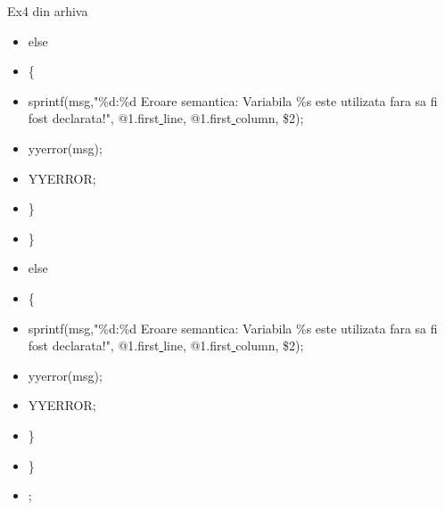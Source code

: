 \documentclass[pdf]{beamer}
\begin{document}
\begin{frame}[shrink=10]{Ex4 din arhiva}
\begin{itemize}
\item 
 else
 \item \hspace{4mm}
	  \{
\item \hspace{6mm}
	    sprintf(msg,"\%d:\%d Eroare semantica: Variabila \%s este utilizata fara sa fi fost declarata!", @1.first\underline{ }line, @1.first\underline{ }column, \$2);
\item \hspace{6mm}
	    yyerror(msg);
\item \hspace{6mm}
	    YYERROR;
\item \hspace{4mm}
	  \}
\item \hspace{3mm}
	\}
\item \hspace{3mm}
	else
\item \hspace{3mm}
	\{
\item \hspace{4mm}
	  sprintf(msg,"\%d:\%d Eroare semantica: Variabila \%s este utilizata fara sa fi fost declarata!", @1.first\underline{ }line, @1.first\underline{ }column, \$2);
\item \hspace{4mm}
	  yyerror(msg);
\item \hspace{4mm}
	  YYERROR;
\item \hspace{3mm}
	\}
\item \hspace{2mm}
      \}
\item \hspace{1mm}
    ;
\end{itemize}
\end{frame}
\end{document}

